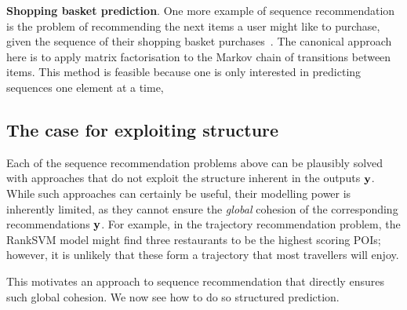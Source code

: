 %
\textbf{Shopping basket prediction}.
One more example of sequence recommendation is the problem of recommending the next items a user might like to purchase, given the sequence of their shopping basket purchases~\citep{Rendle:2010,Wang:2015}.
The canonical approach here is to apply matrix factorisation to the Markov chain of transitions between items.
This method is feasible because one is only interested in predicting sequences one element at a time, 


%
\subsection{The case for exploiting structure}

Each of the sequence recommendation problems above can be plausibly solved with approaches that do not exploit the structure inherent in the outputs $\mathbf{y}$.%
While such approaches can certainly be useful,
their modelling power is inherently limited,
as
they cannot ensure the \emph{global} cohesion of the corresponding recommendations $\mathbf{y}$.
For example, in the trajectory recommendation problem, the RankSVM model %
might find three restaurants to be the highest scoring POIs;
however, it is unlikely that these form a trajectory that most travellers will enjoy.

This motivates an approach to sequence recommendation that directly ensures such global cohesion.
We now see how to do so  structured prediction. %



%


